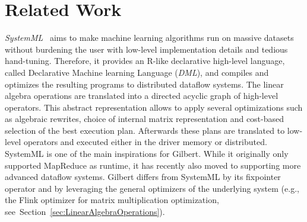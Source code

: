 \section{Related Work}
\label{sec:relatedWork}

{\em SystemML}~\cite{ghoting:2011a,Boehm2014,Boehm2014Hybrid,Schelter2015,Elgohary2016} aims to make machine learning algorithms run on massive datasets without burdening the user with low-level implementation details and tedious hand-tuning. Therefore, it provides an R-like declarative high-level language, called Declarative Machine learning Language (\emph{DML}), and compiles and optimizes the resulting programs to distributed dataflow systems.  The linear algebra operations are translated into a directed acyclic graph of high-level operators. This abstract representation allows to apply several optimizations such as algebraic rewrites, choice of internal matrix representation and cost-based selection of the best execution plan. Afterwards these plans are translated to low-level operators and executed either in the driver memory or distributed. SystemML is one of the main inspirations for Gilbert. While it originally only supported MapReduce as runtime, it has recently also moved to supporting more advanced dataflow systems. Gilbert differs from SystemML by its fixpointer operator and by leveraging the general optimizers of the underlying system (e.g., the Flink optimizer for matrix multiplication optimization, see~Section~\ref{sec:LinearAlgebraOperations}).

